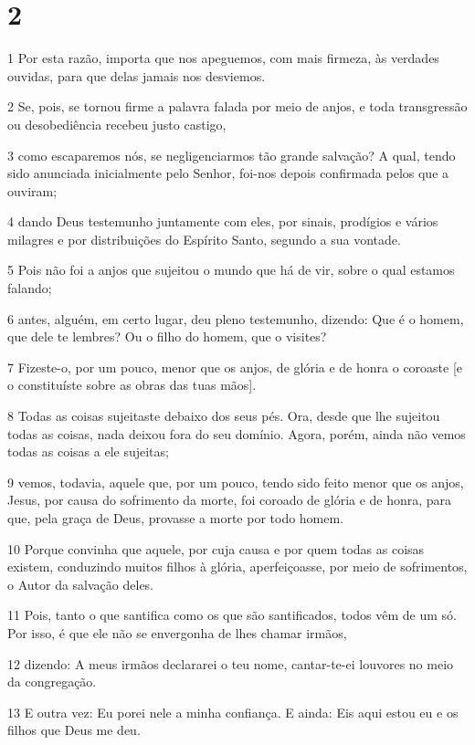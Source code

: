 \chapter{2}

\par 1 Por esta razão, importa que nos apeguemos, com mais firmeza, às verdades ouvidas, para que delas jamais nos desviemos.
\par 2 Se, pois, se tornou firme a palavra falada por meio de anjos, e toda transgressão ou desobediência recebeu justo castigo,
\par 3 como escaparemos nós, se negligenciarmos tão grande salvação? A qual, tendo sido anunciada inicialmente pelo Senhor, foi-nos depois confirmada pelos que a ouviram;
\par 4 dando Deus testemunho juntamente com eles, por sinais, prodígios e vários milagres e por distribuições do Espírito Santo, segundo a sua vontade.
\par 5 Pois não foi a anjos que sujeitou o mundo que há de vir, sobre o qual estamos falando;
\par 6 antes, alguém, em certo lugar, deu pleno testemunho, dizendo: Que é o homem, que dele te lembres? Ou o filho do homem, que o visites?
\par 7 Fizeste-o, por um pouco, menor que os anjos, de glória e de honra o coroaste [e o constituíste sobre as obras das tuas mãos].
\par 8 Todas as coisas sujeitaste debaixo dos seus pés. Ora, desde que lhe sujeitou todas as coisas, nada deixou fora do seu domínio. Agora, porém, ainda não vemos todas as coisas a ele sujeitas;
\par 9 vemos, todavia, aquele que, por um pouco, tendo sido feito menor que os anjos, Jesus, por causa do sofrimento da morte, foi coroado de glória e de honra, para que, pela graça de Deus, provasse a morte por todo homem.
\par 10 Porque convinha que aquele, por cuja causa e por quem todas as coisas existem, conduzindo muitos filhos à glória, aperfeiçoasse, por meio de sofrimentos, o Autor da salvação deles.
\par 11 Pois, tanto o que santifica como os que são santificados, todos vêm de um só. Por isso, é que ele não se envergonha de lhes chamar irmãos,
\par 12 dizendo: A meus irmãos declararei o teu nome, cantar-te-ei louvores no meio da congregação.
\par 13 E outra vez: Eu porei nele a minha confiança. E ainda: Eis aqui estou eu e os filhos que Deus me deu.
